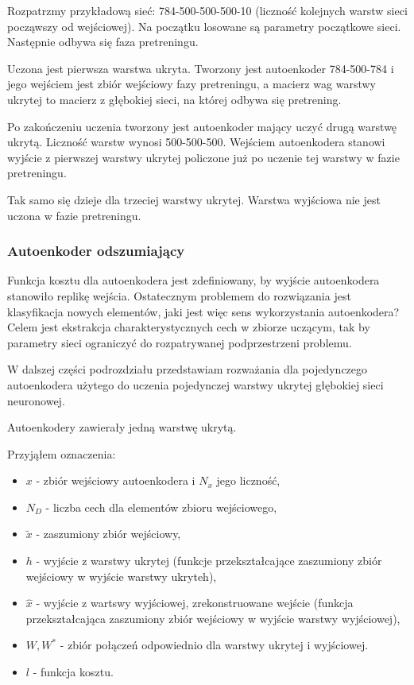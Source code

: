 \documentclass[fleqn]{scrartcl}
\begin{document}
Rozpatrzmy przykładową sieć: 784-500-500-500-10 (liczność kolejnych warstw sieci począwszy od wejściowej). Na początku losowane są parametry początkowe sieci. Następnie odbywa się faza pretreningu. 

Uczona jest pierwsza warstwa ukryta. Tworzony jest autoenkoder 784-500-784 i jego wejściem jest zbiór wejściowy fazy pretreningu, a macierz wag warstwy ukrytej to macierz z głębokiej sieci, na której odbywa się pretrening.

Po zakończeniu uczenia tworzony jest autoenkoder mający uczyć drugą warstwę ukrytą. Liczność warstw wynosi 500-500-500. Wejściem autoenkodera stanowi wyjście z pierwszej warstwy ukrytej policzone już po uczenie tej warstwy w fazie pretreningu. 

Tak samo się dzieje dla trzeciej warstwy ukrytej. Warstwa wyjściowa nie jest uczona w fazie pretreningu.

\subsubsection{Autoenkoder odszumiający}
Funkcja kosztu dla autoenkodera jest zdefiniowany, by wyjście autoenkodera stanowiło replikę wejścia. Ostatecznym problemem do rozwiązania jest klasyfikacja nowych elementów, jaki jest więc sens wykorzystania autoenkodera? Celem jest ekstrakcja charakterystycznych cech w zbiorze uczącym, tak by parametry sieci ograniczyć do rozpatrywanej podprzestrzeni problemu. 

W dalszej części podrozdziału przedstawiam rozważania dla pojedynczego autoenkodera użytego do uczenia pojedynczej warstwy ukrytej głębokiej sieci neuronowej. 

Autoenkodery zawierały jedną warstwę ukrytą.

Przyjąłem oznaczenia:
\begin{itemize}
  \item $x$ - zbiór wejściowy autoenkodera i $N_{x}$ jego liczność,
  \item $N_{D}$ - liczba cech dla elementów zbioru wejściowego, 
  \item $\widetilde{x}$ - zaszumiony zbiór wejściowy,
  \item $h$ - wyjście z warstwy ukrytej (funkcje przekształcające zaszumiony zbiór wejściowy w wyjście warstwy ukryteh),
  \item $\hat{x}$ - wyjście z wartswy wyjściowej, zrekonstruowane wejście (funkcja przekształcająca zaszumiony zbiór wejściowy w wyjście warstwy wyjściowej),
  \item $W, W^{*}$ - zbiór połączeń odpowiednio dla warstwy ukrytej i wyjściowej.
  \item $l$ - funkcja kosztu.
\end{itemize}
\end{document}
